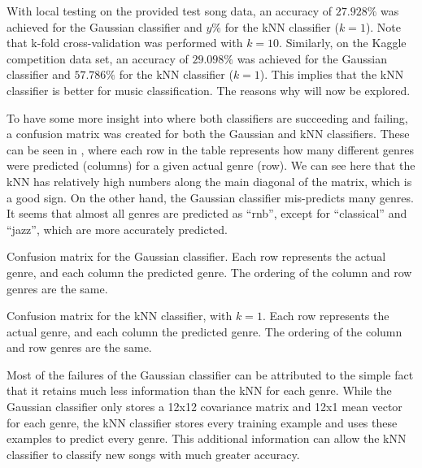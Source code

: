 \documentclass[a4paper,titlepage]{article}
\begin{document}
	With local testing on the provided test song data, an accuracy of $27.928\%$ was achieved for the Gaussian classifier and $y\%$ for the kNN classifier ($k = 1$). Note that k-fold cross-validation was performed with $k=10$. Similarly, on the Kaggle competition data set, an accuracy of $29.098\%$ was achieved for the Gaussian classifier and $57.786\%$ for the kNN classifier ($k = 1$). This implies that the kNN classifier is better for music classification. The reasons why will now be explored.
	
	To have some more insight into where both classifiers are succeeding and failing, a confusion matrix was created for both the Gaussian and kNN classifiers. These can be seen in , where each row in the table represents how many different genres were predicted (columns) for a given actual genre (row). We can see here that the kNN has relatively high numbers along the main diagonal of the matrix, which is a good sign. On the other hand, the Gaussian classifier mis-predicts many genres. It seems that almost all genres are predicted as ``rnb'', except for ``classical'' and ``jazz'', which are more accurately predicted.
	
	\begin{table}[!htb]
		\centering
		\caption{Confusion matrix for the Gaussian classifier. Each row represents the actual genre, and each column the predicted genre. The ordering of the column and row genres are the same.}
		\label{table:confusion_gaussian}
	\end{table}

	\begin{table}[!htb]
		\centering
		\caption{Confusion matrix for the kNN classifier, with $k = 1$. Each row represents the actual genre, and each column the predicted genre. The ordering of the column and row genres are the same.}
		\label{table:confusion_knn_1}
	\end{table}
	
	Most of the failures of the Gaussian classifier can be attributed to the simple fact that it retains much less information than the kNN for each genre. While the Gaussian classifier only stores a 12x12 covariance matrix and 12x1 mean vector for each genre, the kNN classifier stores every training example and uses these examples to predict every genre. This additional information can allow the kNN classifier to classify new songs with much greater accuracy.
		
\end{document}
